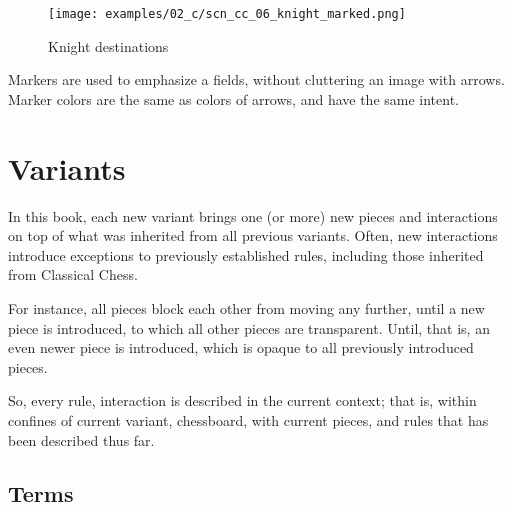 \vspace*{-0.7\baselineskip}
\noindent
\begin{wrapfigure}[6]{l}{0.4\textwidth}
\centering
\texttt{[image: examples/02\_c/scn\_cc\_06\_knight\_marked.png]}
\vspace*{-1.4\baselineskip}
\caption{Knight destinations}
\label{fig:scn_cc_06_knight_marked}
\end{wrapfigure}
Markers are used to emphasize a fields, without cluttering an image with arrows. \newline
\indent
Marker colors are the same as colors of arrows, and have the same intent.

\clearpage %

\section*{Variants}
\label{sec:Classical Chess/Variants}

In this book, each new variant brings one (or more) new pieces and interactions
on top of what was inherited from all previous variants. Often, new interactions
introduce exceptions to previously established rules, including those inherited
from Classical Chess.

For instance, all pieces block each other from moving any further, until a new
piece is introduced, to which all other pieces are transparent. Until, that is,
an even newer piece is introduced, which is opaque to all previously introduced
pieces.


So, every rule, interaction is described in the current context; that is, within
confines of current variant, chessboard, with current pieces, and rules that has
been described thus far.

\subsection*{Terms}
\label{sec:Classical Chess/Variants/Terms}

